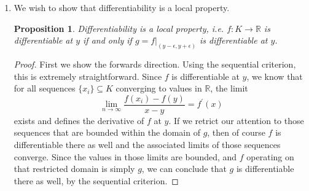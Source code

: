 \documentclass[letterpaper,11pt]{article}
\newtheorem{prop}{Proposition}
\newcommand{\R}{\mathbb{R}}
\begin{document}
\begin{enumerate}
    \item
        We wish to show that differentiability is a local property.

        \begin{prop}
            Differentiability is a local property, i.e. $f : K \to \R$ is
            differentiable at $y$ if and only if
            $g = f|_{(y-\epsilon, y+\epsilon)}$ is differentiable at $y$.
        \end{prop}

        \begin{proof}
            First we show the forwards direction. Using the sequential
            criterion, this is extremely straightforward. Since $f$ is
            differentiable at $y$, we know that for all sequences
            $\{x_i\} \subseteq K$ converging to values in $\R$, the limit
            \begin{equation*}
                \lim_{n\to\infty}{
                    \frac{f(x_i) - f(y)}{x - y} = f^\prime (x)
                }
            \end{equation*}
            exists and defines the derivative of $f$ at $y$. If we retrict our
            attention to those sequences that are bounded within the domain of
            $g$, then of course $f$ is differentiable there as well and the
            associated limits of those sequences converge. Since the values in
            those limits are bounded, and $f$ operating on that restricted
            domain is simply $g$, we can conclude that $g$ is differentiable
            there as well, by the sequential criterion.


\end{proof}
\end{enumerate}
\end{document}
